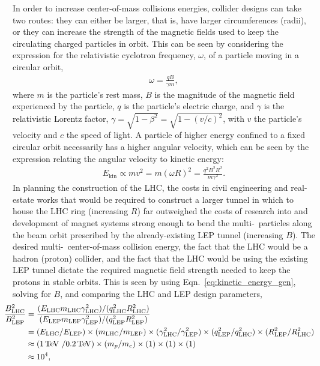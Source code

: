 In order to increase center-of-mass collisions energies, collider designs can take two routes: they can
either be larger, that is, have larger circumferences (radii), or they can increase the strength of the magnetic
fields used to keep the circulating charged particles in orbit. This can be seen by considering the expression
for the relativistic cyclotron frequency, $\omega$, of a particle moving in a circular orbit,
\begin{align}
    \omega = \frac{qB}{\gamma m},
    \label{eq:rel_cyclotron}
\end{align}
where $m$ is the particle's rest mass, $B$ is the magnitude of the magnetic field experienced by the
particle, $q$ is the particle's electric charge, and $\gamma$ is the relativistic Lorentz factor, $\gamma = \sqrt{1 - \beta^2} = \sqrt{1 - (v/c)^2}$,
with $v$ the particle's velocity and $c$ the speed of light. A particle of higher energy confined
to a fixed circular orbit necessarily has a higher
angular velocity, which can be seen by the expression relating the angular velocity to kinetic energy:
\begin{align}
    E_{\text{kin}} \propto m v^2 = m(\omega R)^2 = \frac{q^2 B^2 R^2}{m \gamma^2}.
    \label{eq:kinetic_energy_gen}
\end{align}
In planning the construction of the LHC, the costs in civil engineering and real-estate works that would
be required to construct a larger tunnel in which to house the LHC ring (increasing $R$) far outweighed
the costs of research into and development of magnet systems strong enough to bend the
multi-\TeV~particles along the beam orbit prescribed by the already-existing LEP tunnel (increasing $B$).
The desired multi-\TeV~center-of-mass collision energy, the fact that the LHC would be a hadron (proton)
collider, and the fact that the LHC would be using the existing LEP tunnel dictate the required magnetic
field strength needed to keep the protons in stable orbits. This
is seen by using Eqn.~\ref{eq:kinetic_energy_gen}, solving for $B$, and comparing the LHC and LEP
design parameters,
\begin{align}
    \hspace{-0.4cm}
    \frac{B^2_{\text{LHC}}}{B^2_\text{LEP}} &= \frac{ (E_{\text{LHC}} m_{\text{LHC}} \gamma_{\text{LHC}}^2) / (q_{\text{LHC}}^2 R_{\text{LHC}}^2)  } { (E_{\text{LEP}} m_{\text{LEP}} \gamma_{\text{LEP}}^2) / (q_{\text{LEP}}^2 R_{\text{LEP}}^2) } \label{eq:lhc_mag_field} \\
        &= (E_{\text{LHC}} / E_{\text{LEP}}) \times (m_{\text{LHC}} / m_{\text{LEP}}) \times (\gamma_{\text{LHC}}^2 / \gamma_{\text{LEP}}^2) \times (q_{\text{LEP}}^2 / q_{\text{LHC}}^2) \times (R_{\text{LEP}}^2 / R_{\text{LHC}}^2) \notag \\
        &\approx ( 1\,\TeV~/0.2\,\TeV) \times (m_p/ m_e) \times (1) \times (1) \times (1) \notag \\
        &\approx 10^4 \notag,
\end{align}
